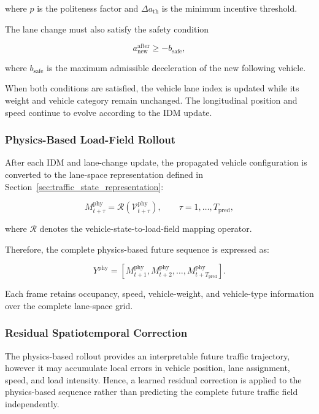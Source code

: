 \documentclass[journal]{IEEEtran}
\begin{document}
where $p$ is the politeness factor and $\Delta a_{\mathrm{th}}$ is the minimum incentive threshold.

The lane change must also satisfy the safety condition

\begin{equation}
a_{\mathrm{new}}^{\mathrm{after}}
\geq
-b_{\mathrm{safe}},
\end{equation}

where $b_{\mathrm{safe}}$ is the maximum admissible deceleration of the new following vehicle.

When both conditions are satisfied, the vehicle lane index is updated while its weight and vehicle category remain unchanged. The longitudinal position and speed continue to evolve according to the IDM update.


\subsubsection{Physics-Based Load-Field Rollout}

After each IDM and lane-change update, the propagated vehicle configuration is converted to the lane-space representation defined in Section~\ref{sec:traffic_state_representation}:

\begin{equation}
M_{t+\tau}^{\mathrm{phy}}
=
\mathcal{R}\left(
\mathcal{V}_{t+\tau}^{\mathrm{phy}}
\right),
\qquad
\tau=1,\ldots,T_{\mathrm{pred}},
\end{equation}

where $\mathcal{R}$ denotes the vehicle-state-to-load-field mapping operator.

Therefore, the complete physics-based future sequence is expressed as:

\begin{equation}
Y^{\mathrm{phy}}
=
\left[
M_{t+1}^{\mathrm{phy}},
M_{t+2}^{\mathrm{phy}},
\ldots,
M_{t+T_{\mathrm{pred}}}^{\mathrm{phy}}
\right].
\end{equation}

Each frame retains occupancy, speed, vehicle-weight, and vehicle-type information over the complete lane-space grid.


\subsubsection{Residual Spatiotemporal Correction}

The physics-based rollout provides an interpretable future traffic trajectory, however it may accumulate local errors in vehicle position, lane assignment, speed, and load intensity. Hence, a learned residual correction is applied to the physics-based sequence rather than predicting the complete future traffic field independently.
\end{document}
